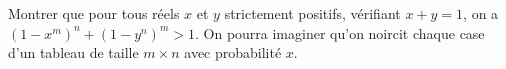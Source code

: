 Montrer que pour tous réels $x$ et $y$ strictement positifs, vérifiant $x + y = 1$, on a $(1 - x^m)^n + (1 - y^n)^m > 1$. On pourra imaginer qu'on noircit chaque case d'un tableau de taille $m \times n$ avec probabilité $x$.
